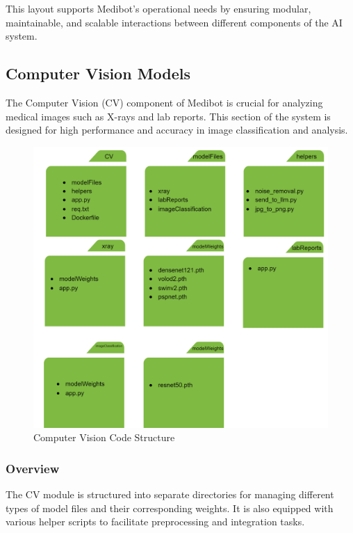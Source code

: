 This layout supports Medibot’s operational needs by ensuring modular, maintainable, and scalable interactions between different components of the AI system.

\subsection{Computer Vision Models}
The Computer Vision (CV) component of Medibot is crucial for analyzing medical images such as X-rays and lab reports. This section of the system is designed for high performance and accuracy in image classification and analysis.

\begin{figure}[H]
    \centering
    \includegraphics[width=\textwidth]{./Figures/CVCodeStructure.png}
    \caption{Computer Vision Code Structure}
    \label{fig:cv_code_structure}
\end{figure}

\subsubsection{Overview}
The CV module is structured into separate directories for managing different types of model files and their corresponding weights. It is also equipped with various helper scripts to facilitate preprocessing and integration tasks.

